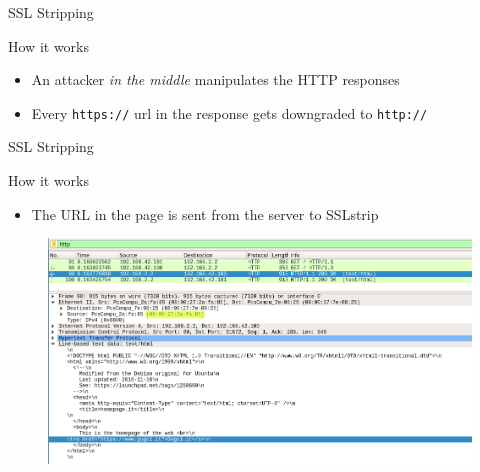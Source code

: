 \documentclass{beamer}
\begin{document}
\begin{frame}{SSL Stripping}
  \begin{block}{How it works}
    \begin{itemize}
      \item An attacker \textit{in the middle} manipulates the HTTP responses
      \item Every \texttt{https://} url in the response gets downgraded to \texttt{http://}
    \end{itemize}
  \end{block}
\end{frame}

\begin{frame}{SSL Stripping}
  \begin{block}{How it works}
    \begin{itemize}
      \item The URL in the page is sent from the server to SSLstrip
    \end{itemize}
  \end{block}
  \begin{figure}
    \includegraphics[width=\textwidth]{figures/sslstrip_https}
    \caption*{}
  \end{figure}
\end{frame}
\end{document}
